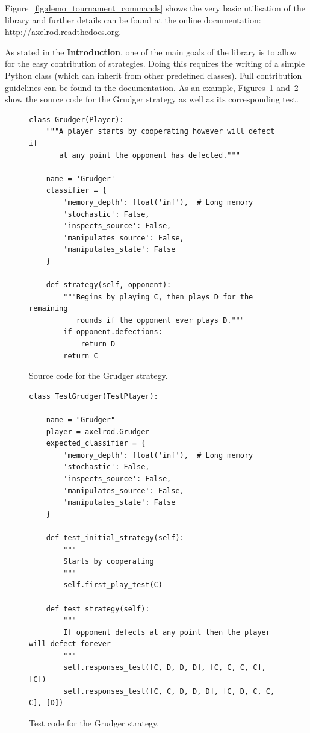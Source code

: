 \documentclass{jors}
\begin{document}
Figure~\ref{fig:demo_tournament_commands} shows the very basic utilisation
of the library and further details can be found at the online documentation:
\url{http://axelrod.readthedocs.org}.

As stated in the \textbf{Introduction}, one of the main goals of the library
is to allow for the easy contribution of strategies. Doing this requires the
writing of a simple Python class (which can inherit from other predefined
classes). Full contribution guidelines can be found in the documentation.
As an example, Figures~\ref{fig:grudger} and~\ref{fig:grudger_test} show the source code for
the Grudger strategy as well as its corresponding test.

\begin{figure}[!hbtp]
    \begin{verbatim}
class Grudger(Player):
    """A player starts by cooperating however will defect if
       at any point the opponent has defected."""

    name = 'Grudger'
    classifier = {
        'memory_depth': float('inf'),  # Long memory
        'stochastic': False,
        'inspects_source': False,
        'manipulates_source': False,
        'manipulates_state': False
    }

    def strategy(self, opponent):
        """Begins by playing C, then plays D for the remaining
           rounds if the opponent ever plays D."""
        if opponent.defections:
            return D
        return C
    \end{verbatim}
    \caption{Source code for the Grudger strategy.}
    \label{fig:grudger}
\end{figure}



\begin{figure}[!hbtp]
    \begin{verbatim}
class TestGrudger(TestPlayer):

    name = "Grudger"
    player = axelrod.Grudger
    expected_classifier = {
        'memory_depth': float('inf'),  # Long memory
        'stochastic': False,
        'inspects_source': False,
        'manipulates_source': False,
        'manipulates_state': False
    }

    def test_initial_strategy(self):
        """
        Starts by cooperating
        """
        self.first_play_test(C)

    def test_strategy(self):
        """
        If opponent defects at any point then the player will defect forever
        """
        self.responses_test([C, D, D, D], [C, C, C, C], [C])
        self.responses_test([C, C, D, D, D], [C, D, C, C, C], [D])
    \end{verbatim}
    \caption{Test code for the Grudger strategy.}
    \label{fig:grudger_test}
\end{figure}
\end{document}
